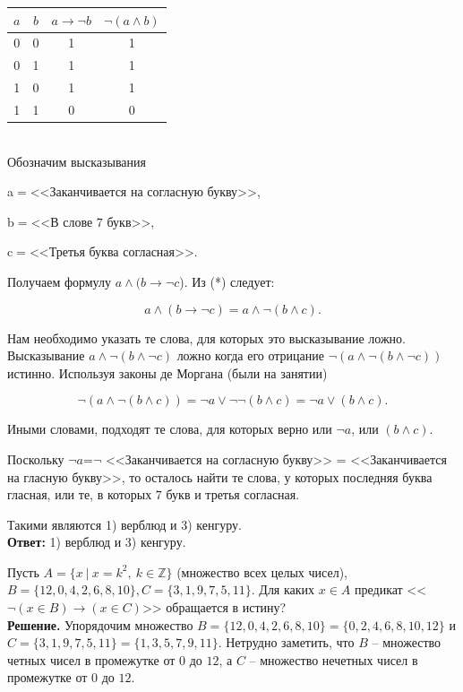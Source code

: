 \documentclass[a4paper,12pt]{article}
\newcommand{\ZZ}{\mathbb{Z}}
\newcounter{z}
\newcommand{\z}{\refstepcounter{z}\vskip 20pt\noindent
\fbox{\textbf{\arabic{z}}} }
\begin{document}
\begin{tabular}{|c|c|c|c|}
\hline$a$ & $b$ & $a\rightarrow \neg b$ & $\neg (a \wedge b)$ \\
\hline 0 & 0 & 1 & 1 \\
\hline 0 & 1 & 1 & 1 \\
\hline 1 & 0 & 1 & 1 \\
\hline 1 & 1 & 0 & 0 \\
\hline
\end{tabular}
\\

Обозначим высказывания

a$=$<<Заканчивается на согласную букву>>, 

b$=$<<В слове $7$ букв>>,

c$=$<<Третья буква согласная>>.

Получаем формулу $a\wedge (b \rightarrow \neg c$). Из (*) следует:

$$a\wedge (b \rightarrow \neg c)=a\wedge \neg( b \wedge c).$$

Нам необходимо указать те слова, для которых это высказывание ложно. Высказывание
$a\wedge \neg( b \wedge \neg c)$ ложно когда его отрицание $\neg (a\wedge \neg( b \wedge \neg c))$ истинно. Используя законы де Моргана (были на занятии)

$$\neg (a\wedge \neg( b \wedge c))=\neg a \vee \neg\neg( b \wedge c)=\neg a \vee ( b \wedge c).$$

Иными словами, подходят те слова, для которых верно или $\neg a$, или $( b \wedge c)$.

Поскольку $\neg a$=$\neg$ <<Заканчивается на согласную букву>> = <<Заканчивается на гласную букву>>, то осталось найти те слова, у которых последняя буква гласная, или те, в которых $7$ букв и третья согласная.

Такими являются  1) верблюд и 3) кенгуру.\\


{\bf Ответ:} 1) верблюд и 3) кенгуру.

\z Пусть $A=\{ x\ |\ x=k^2,\ k\in \ZZ \}$ (множество всех целых чисел), $B=\{12,0,4,2,6,8,10\}, C= \{ 3,1,9,7,5,11\}$. Для каких $x\in A$ предикат <<$\neg(x \in B)\rightarrow (x \in C)$>> обращается в истину?\\

{\bf Решение.} Упорядочим множество $B=\{12,0,4,2,6,8,10\}=\{0,2,4,6,8,10,12\}$ и $C= \{ 3,1,9,7,5,11\}=\{ 1,3,5,7,9,11\}$. Нетрудно заметить, что $B$ -- множество четных чисел в промежутке от $0$ до $12$, а $C$ -- множество нечетных чисел в промежутке от $0$ до $12$.\\
\end{document}
